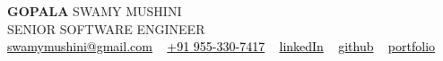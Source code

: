 \documentclass[10pt]{article}
\begin{document}
\begin{flushleft}
    {\Huge  \textbf{GOPALA} SWAMY MUSHINI}\\[2.8ex]  %
    { SENIOR SOFTWARE ENGINEER}\\[2ex]  %

    \textcolor{db5c31}{\faEnvelope} \href{mailto:swamymushini@gmail.com}{\textcolor{black}{\large swamymushini@gmail.com}} 
    \hspace{1mm} \textbullet\ \hspace{1mm}
    \textcolor{db5c31}{\faPhone} \href{tel:+91-9553307417}{\textcolor{black}{\large +91 955-330-7417}} 
    \hspace{1mm} \textbullet\ \hspace{1mm}
    \textcolor{db5c31}{\faLinkedin} \href{https://www.linkedin.com/in/gopal-swamy-sde3/}{\textcolor{black}{\large linkedIn}} 
    \hspace{1mm} \textbullet\ \hspace{1mm}
    \textcolor{db5c31}{\faGithub} \href{https://github.com/swamymushini}{\textcolor{black}{\large github}} 
    \hspace{1mm} \textbullet\ \hspace{1mm}
    \textcolor{db5c31}{\faGlobe} \href{https://gopalaswamy.me}{\textcolor{black}{\large portfolio}} 

\end{flushleft}
\vspace{-2.4ex}
\end{document}
